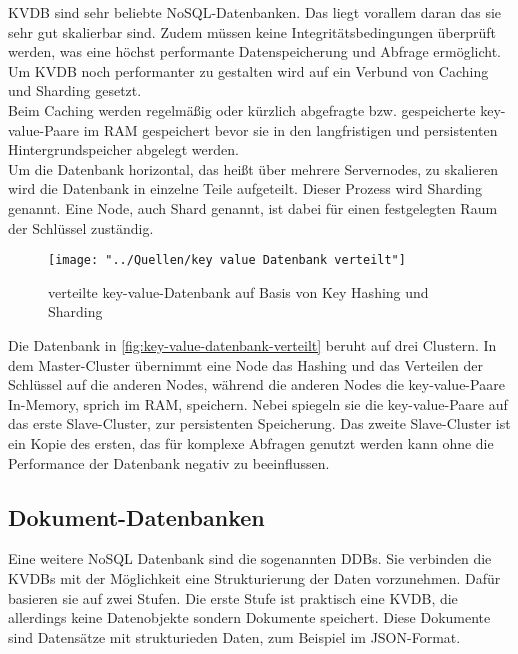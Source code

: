 \documentclass[12pt, a4paper, twoside]{article}
\begin{document}
		\ac{KVDB} sind sehr beliebte NoSQL-Datenbanken. Das liegt vorallem daran das sie sehr gut skalierbar sind. Zudem müssen keine Integritätsbedingungen überprüft werden, was eine höchst performante Datenspeicherung und Abfrage ermöglicht. \\
		Um \ac{KVDB} noch performanter zu gestalten wird auf ein Verbund von Caching und Sharding gesetzt.\\
		Beim Caching werden regelmäßig oder kürzlich abgefragte bzw. gespeicherte key-value-Paare im RAM gespeichert bevor sie in den langfristigen und persistenten Hintergrundspeicher abgelegt werden.\\
		Um die Datenbank horizontal, das heißt über mehrere Servernodes, zu skalieren wird die Datenbank in einzelne Teile aufgeteilt. Dieser Prozess wird Sharding genannt. Eine Node, auch Shard genannt, ist dabei für einen festgelegten Raum der Schlüssel zuständig. \\
		
\begin{figure}[H]
	\centering
	\texttt{[image: "../Quellen/key value Datenbank verteilt"]}
	\caption[]{verteilte key-value-Datenbank auf Basis von Key Hashing und Sharding}
	\label{fig:key-value-datenbank-verteilt}
\end{figure}

		Die Datenbank in \autoref{fig:key-value-datenbank-verteilt} beruht auf drei Clustern. In dem Master-Cluster übernimmt eine Node das Hashing und das Verteilen der Schlüssel auf die anderen Nodes, während die anderen Nodes die key-value-Paare In-Memory, sprich im RAM, speichern. Nebei spiegeln sie die key-value-Paare auf das erste Slave-Cluster, zur persistenten Speicherung. Das zweite Slave-Cluster ist ein Kopie des ersten, das für komplexe Abfragen genutzt werden kann ohne die Performance der Datenbank negativ zu beeinflussen.
		
		\subsection{Dokument-Datenbanken}
			Eine weitere NoSQL Datenbank sind die sogenannten \acp{DDB}. Sie verbinden die \acp{KVDB} mit der Möglichkeit eine Strukturierung der Daten vorzunehmen.  Dafür basieren sie auf zwei Stufen. Die erste Stufe ist praktisch eine \ac{KVDB}, die allerdings keine Datenobjekte sondern Dokumente speichert. Diese Dokumente sind Datensätze mit strukturieden Daten, zum Beispiel im \ac{JSON}-Format.
			
\end{document}
